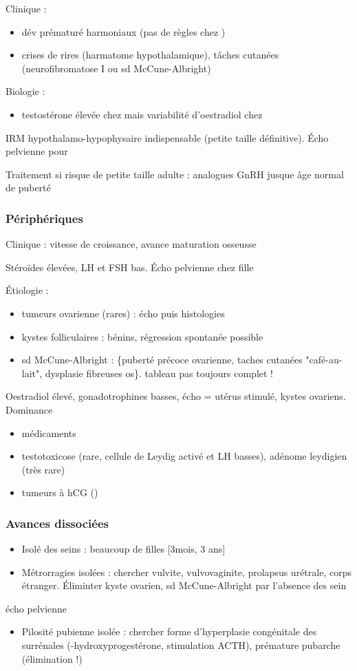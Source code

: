 \documentclass[11pt]{article}
\begin{document}
Clinique : 
\begin{itemize}
\item dév prématuré harmoniaux (pas de règles chez \female)
\item crises de rires (harmatome hypothalamique), tâches cutanées (neurofibromatose
I ou sd McCune-Albright)
\end{itemize}
Biologie :
\begin{itemize}
\item testostérone élevée chez \male mais variabilité d'oestradiol chez \female
\end{itemize}

IRM hypothalamo-hypophysaire indispensable \danger (petite taille
définitive). Écho pelvienne pour \female

Traitement si risque de petite taille adulte : analogues GnRH jusque âge normal
de puberté
\subsubsection{Périphériques}
\label{sec:org4dbfc75}
Clinique : \inc vitesse de croissance, avance maturation osseusse

Stéroïdes élevées, LH et FSH bas. Écho pelvienne chez fille

Étiologie :
\begin{itemize}
\item tumeurs ovarienne (rares) : écho puis histologies
\item kystes folliculaires : bénins, régression spontanée possible
\item sd McCune-Albright : \{puberté précoce ovarienne, taches cutanées
"café-au-lait", dysplasie fibreuses os\}. \danger tableau pas toujours complet
!\\
\end{itemize}
Oestradiol élevé, gonadotrophines basses, écho = utérus stimulé, kystes
ovariens. Dominance \female
\begin{itemize}
\item médicaments
\item testotoxicose (rare, cellule de Leydig activé et LH basses), adénome leydigien
(très rare)
\item tumeurs à hCG (\male)
\end{itemize}
\subsubsection{Avances dissociées}
\label{sec:orgc6550fa}
\begin{itemize}
\item Isolé des seins : beaucoup de filles [3mois, 3 ans]
\item Métrorragies isolées : chercher vulvite, vulvovaginite, prolapsus urétrale,
corps étranger. Éliminter kyste ovarien, sd McCune-Albright par l'absence des
sein
\end{itemize}
\thus écho pelvienne
\begin{itemize}
\item Pilosité pubienne isolée : chercher forme d'hyperplasie congénitale des
surrénales (-hydroxyprogestérone, stimulation ACTH), prémature pubarche
(élimination !)
\end{itemize}
\end{document}

